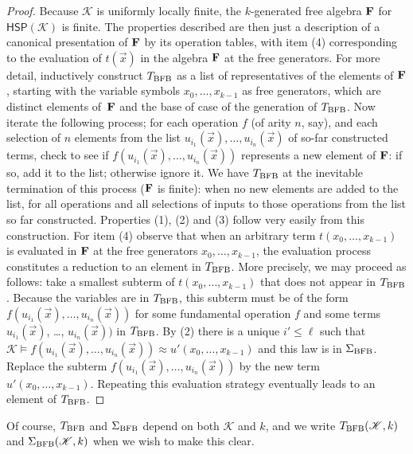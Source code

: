 \documentclass[10pt,a4paper]{amsart}
\theoremstyle{plain}
\theoremstyle{definition}
\begin{document}
\begin{proof} 
Because $\mathscr{K}$ is uniformly locally finite, the $k$-generated free algebra ${\bf F}$ for $\mathsf{HSP}(\mathscr{K})$ is finite.  The properties described are then just a description of a canonical presentation of ${\bf F}$ by its operation tables, with item (4) corresponding to the evaluation of $t(\vec{x})$ in the algebra ${\bf F}$ at the free generators.  For more detail, inductively construct $T_{\rm BFB}$ as a list of representatives of the elements of ${\bf F}$, starting with the variable symbols $x_0,\dots,x_{k-1}$ as free generators, which are distinct elements of~${\bf F}$ and the base of case of the generation of $T_{\rm BFB}$.  Now iterate the following process; for each operation $f$ (of arity $n$, say), and each selection of $n$ elements from the list $u_{i_1}(\vec{x}),\dots,u_{i_n}(\vec{x})$ of so-far constructed terms, check to see if $f(u_{i_1}(\vec{x}),\dots,u_{i_n}(\vec{x}))$ represents a new element of ${\bf F}$: if so, add it to the list; otherwise ignore it.  We have $T_{\rm BFB}$ at the inevitable termination of this process (${\bf F}$ is finite): when no new elements are added to the list, for all operations and all selections of inputs to those operations from the list so far constructed. 
Properties (1), (2) and (3) follow very easily from this construction.    
For item (4) observe that when an arbitrary term $t(x_0,\dots,x_{k-1})$ is evaluated in ${\bf F}$ at the free generators $x_0,\dots,x_{k-1}$, the evaluation process constitutes a reduction to an element in $T_{\rm BFB}$.  More precisely, we may proceed as follows: take a smallest subterm of $t(x_0,\dots,x_{k-1})$ that does not appear in $T_{\rm BFB}$.  Because the variables are in $T_{\rm BFB}$, this subterm must be of the form $f(u_{i_1}(\vec{x}),\dots,u_{i_n}(\vec{x}))$ for some fundamental operation $f$ and some terms 
$u_{i_1}(\vec{x})$, \dots, $u_{i_n}(\vec{x}))$ in $T_{\rm BFB}$.  By (2) there is a unique $i'\leq \ell$ such that $\mathscr{K}\models f(u_{i_1}(\vec{x}),\dots,u_{i_n}(\vec{x}))\approx u'(x_0,\dots,x_{k-1})$ and this law is in $\Sigma_{\rm BFB}$.  Replace the subterm $f(u_{i_1}(\vec{x}),\dots,u_{i_n}(\vec{x}))$ by the new term $u'(x_0,\dots,x_{k-1})$.  Repeating this evaluation strategy eventually leads to an element of $T_{\rm BFB}$.  
\end{proof}

Of course, $T_{\rm BFB}$ and $\Sigma_{\rm BFB}$ depend on both $\mathscr{K}$ and $k$, and we write $T_{\rm BFB}(\mathscr{K},k)$ and $\Sigma_{\rm BFB}(\mathscr{K},k)$ when we wish to make this clear.
\end{document}
